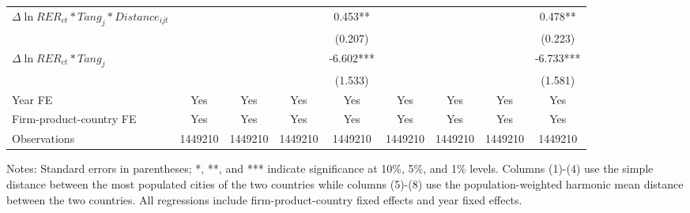 \documentclass[12pt]{article}
\begin{document}
\begin{table}
{\begin{threeparttable}
\begin{tabular}{lcccccccc}
				$\Delta \ln RER_{ct}*Tang_{j}*Distance_{ijt}$ &       &       &       & 0.453**
				&       &       &       & 0.478**\\
				&       &       &       & (0.207) &       &       &       & (0.223)\\
				$\Delta \ln RER_{ct}*Tang_{j}$ &       &       &       & -6.602*** &       &       &       & -6.733***\\
				&       &       &       & (1.533) &       &       &       & (1.581)\\
				Year FE  & Yes   & Yes   & Yes   & Yes & Yes   & Yes   & Yes   & Yes\\
				Firm-product-country FE & Yes   & Yes   & Yes   & Yes & Yes   & Yes   & Yes   & Yes\\
				Observations & 1449210 & 1449210 & 1449210 & 1449210 & 1449210 & 1449210 & 1449210 & 1449210\\
				\bottomrule
			\end{tabular}
			\begin{tablenotes}
				\footnotesize
				\item[Notes:] Standard errors in parentheses; *, **, and *** indicate significance at 10\%, 5\%, and 1\% levels. Columns (1)-(4) use the simple distance between the most populated cities of the two countries while columns (5)-(8) use the population-weighted harmonic mean distance between the two countries. All regressions include firm-product-country fixed effects and year fixed effects.
			\end{tablenotes}
		\end{threeparttable}
	}
	\label{tab.source.distance}
\end{table}
\end{document}
